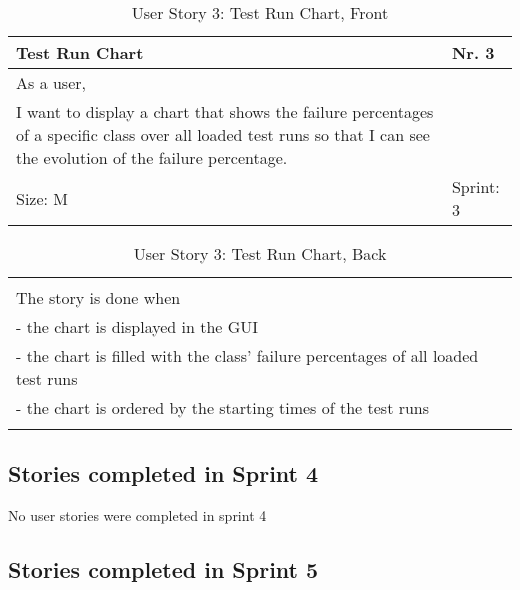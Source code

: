 \begin{table}[H]
  \caption{User Story 3: Test Run Chart, Front}
  \label{Story_3_Front}
  \centering
  \begin{tabular}{|p{9cm} p{2cm}|}
	\hline  	
  	Test Run Chart & Nr. 3 \\ 
  	\hline
  	As a user, &    \\ 
  	I want to display a chart that shows the failure percentages of a specific class over all loaded test runs so that I can see the evolution of the failure percentage. &    \\ 
  	Size: M & Sprint: 3 \\ 
  	\hline
  \end{tabular}
\end{table}
\begin{table}[H]
  \caption{User Story 3: Test Run Chart, Back}
  \label{Story_3_Back}
  \centering
  \begin{tabular}{|p{10cm} p{1cm}|}
  \hline
  	  &    \\ 
  	The story is done when &    \\ 
  	 - the chart is displayed in the GUI & \\ 
  	 - the chart is filled with the class' failure percentages of all loaded test runs & \\ 
  	 - the chart is ordered by the starting times of the test runs & \\ 

  	 
  	  &  
  	   \\ 
  	\hline
  \end{tabular}
\end{table}

\subsection*{Stories completed in Sprint 4}

No user stories were completed in sprint 4

\subsection*{Stories completed in Sprint 5}


